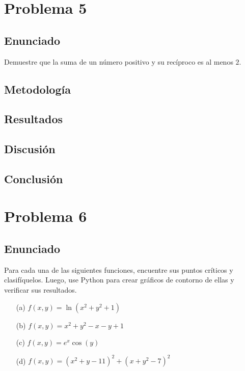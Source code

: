 \documentclass{article}
\begin{document}
\section{Problema 5}

\subsection{Enunciado}
Demuestre que la suma de un número positivo y su recíproco es al menos $2$.

\subsection{Metodología}

\subsection{Resultados}
\setcounter{equation}{0}

\subsection{Discusión}

\subsection{Conclusión}

\section{Problema 6}

\subsection{Enunciado}
Para cada una de las siguientes funciones, encuentre sus puntos críticos y clasifíquelos. Luego, use Python para crear gráficos de contorno de ellas y verificar sus resultados.

\begin{enumerate}
  \item[(a)] $f(x,y) = \ln(x^{2} + y^{2} + 1)$
  \item[(b)] $f(x,y) = x^{2} + y^{2} - x - y + 1$
  \item[(c)] $f(x,y) = e^{x}\cos(y)$
  \item[(d)] $f(x,y) = (x^{2} + y - 11)^{2} + (x + y^{2} - 7)^{2}$
\end{enumerate}
\end{document}
